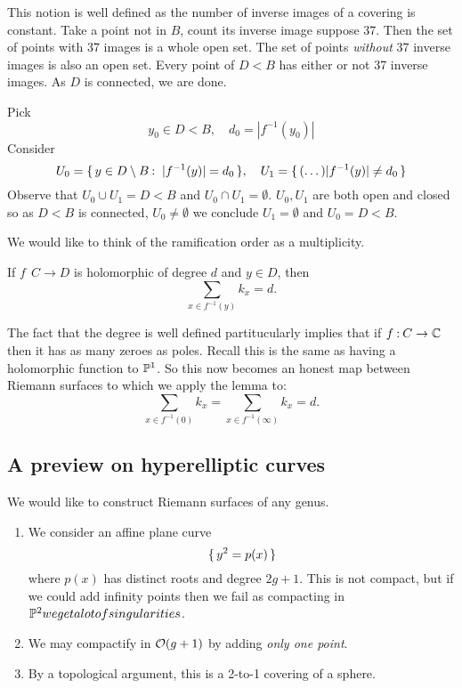 \documentclass[12pt]{memoir}
\begin{document}
This notion is well defined as the number of inverse images of a covering is constant. Take a point not in $B$, count its inverse image suppose 37. Then the set of points with 37 images is a whole open set. The set of points \emph{without} 37 inverse images is also an open set. Every point of $D\less B$ has either or not 37 inverse images. As $D$ is connected, we are done.\par
Pick 
$$y_0\in D\less B,\quad d_0=|f^{-1}(y_0)|$$
Consider 
$$U_0=\set{y\in D\less B\:\ |f^{-1}(y)|=d_0},\quad U_1=\set{(\dots)|f^{-1}(y)|\neq d_0}$$
Observe that $U_0\cup U_1= D\less B$ and $U_0\cap U_1=\emptyset$. $U_0,U_1$ are both open and closed so as $D\less B$ is connected, $U_0\neq \emptyset$ we conclude $U_1=\emptyset$ and $U_0=D\less B$.\par
We would like to think of the ramification order as a multiplicity.

\begin{Lem}
    If $f\:\ C\to D$ is holomorphic of degree $d$ and $y\in D$, then
$$\sum_{x\in f^{-1}(y)}k_x=d.$$
\end{Lem}

The fact that the degree is well defined partitucularly implies that if $f\mathbin{:} C\to \mathbb{C}$ then it has as many zeroes as poles. Recall this is the same as having a holomorphic function to $\mathbb{P}^1$. So this now becomes an honest map between Riemann surfaces to which we apply the lemma to:
$$\sum_{x\in f^{-1}(0)}k_x=\sum_{x\in f^{-1}(\infty)}k_x=d.$$

\subsection{A preview on hyperelliptic curves}

We would like to construct Riemann surfaces of any genus. 

\begin{enumerate}
    \item We consider an affine plane curve
    $$\{\,y^2=p(x)\,\}$$
    where $p(x)$ has distinct roots and degree $2g+1$. This is not compact, but if we could add infinity points then we fail as compacting in $\mathbb{P}^2 we get a lot of singularities$.
    \item We may compactify in $\mathcal{O}(g+1)$ by adding \emph{only one point}.
    \item By a topological argument, this is a 2-to-1 covering of a sphere.
\end{enumerate}

\ifx\nextra\undefined
\printindex
\else\fi
\nocite{*}


\end{document}
